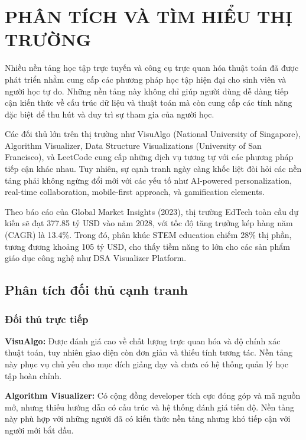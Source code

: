 \chapter{PHÂN TÍCH VÀ TÌM HIỂU THỊ TRƯỜNG}
\label{ch:market-analysis}

Nhiều nền tảng học tập trực tuyến và công cụ trực quan hóa thuật toán đã được phát triển nhằm cung cấp các phương pháp học tập hiện đại cho sinh viên và người học tự do. Những nền tảng này không chỉ giúp người dùng dễ dàng tiếp cận kiến thức về cấu trúc dữ liệu và thuật toán mà còn cung cấp các tính năng đặc biệt để thu hút và duy trì sự tham gia của người học.

Các đối thủ lớn trên thị trường như VisuAlgo (National University of Singapore), Algorithm Visualizer, Data Structure Visualizations (University of San Francisco), và LeetCode cung cấp những dịch vụ tương tự với các phương pháp tiếp cận khác nhau. Tuy nhiên, sự cạnh tranh ngày càng khốc liệt đòi hỏi các nền tảng phải không ngừng đổi mới với các yếu tố như AI-powered personalization, real-time collaboration, mobile-first approach, và gamification elements.

Theo báo cáo của Global Market Insights (2023), thị trường EdTech toàn cầu dự kiến sẽ đạt 377.85 tỷ USD vào năm 2028, với tốc độ tăng trưởng kép hàng năm (CAGR) là 13.4\%. Trong đó, phân khúc STEM education chiếm 28\% thị phần, tương đương khoảng 105 tỷ USD, cho thấy tiềm năng to lớn cho các sản phẩm giáo dục công nghệ như DSA Visualizer Platform.

\section{Phân tích đối thủ cạnh tranh}
\label{sec:competitor-analysis}

\subsection{Đối thủ trực tiếp}
\label{subsec:direct-competitors}

\textbf{VisuAlgo:} Được đánh giá cao về chất lượng trực quan hóa và độ chính xác thuật toán, tuy nhiên giao diện còn đơn giản và thiếu tính tương tác. Nền tảng này phục vụ chủ yếu cho mục đích giảng dạy và chưa có hệ thống quản lý học tập hoàn chỉnh.

\textbf{Algorithm Visualizer:} Có cộng đồng developer tích cực đóng góp và mã nguồn mở, nhưng thiếu hướng dẫn có cấu trúc và hệ thống đánh giá tiến độ. Nền tảng này phù hợp với những người đã có kiến thức nền tảng nhưng khó tiếp cận với người mới bắt đầu.

